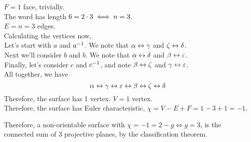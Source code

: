 \documentclass[a4paper,11pt]{report}
\begin{document}
$F = 1$ face, trivially. \\
The word has length $6=2\cdot3\iff n = 3$. \\
$E = n = 3$ edges. \\
Calculating the vertices now,\\
${}^{}$\hspace{1em}Let's start with $a$ and $a^{-1}$. We note that $\alpha\leftrightarrow\gamma$ and $\zeta\leftrightarrow\delta$. \\
${}^{}$\hspace{1em}Next we'll consider $b$ and $b$. We note that $\alpha\leftrightarrow\delta$ and $\beta\leftrightarrow\varepsilon$. \\
${}^{}$\hspace{1em}Finally, let's consider $c$ and $c^{-1}$, and note $\beta\leftrightarrow\zeta$ and $\gamma\leftrightarrow\varepsilon$. \\
All together, we have
$$
  \alpha\leftrightarrow\gamma\leftrightarrow\varepsilon\leftrightarrow\beta\leftrightarrow\zeta\leftrightarrow\delta
$$
Therefore, the surface has 1 vertex. $V=1$ vertex. \\
Therefore, the surface has Euler characteristic, $\chi = V - E + F = 1 - 3 + 1 = -1$. \vspace{0.5em}

Therefore, a non-orientable surface with $\chi=-1 = 2-g \iff g=3$, is the connected sum of 3 projective planes, by the classification theorem.
\end{document}
